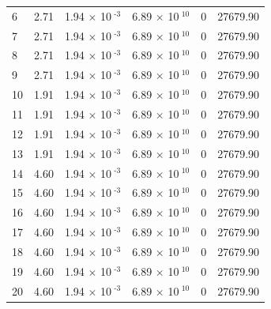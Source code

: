 \documentclass[a4paper,11pt]{article}
\begin{document}
\begin{center}
\begin{longtable}{|R{1.5cm}|R{2.4cm}|R{2.4cm}|R{2.4cm}|R{2.4cm}|R{2.4cm}|}
    6 &   2.71  &         1.94 $\times$ 10$^{\text{          -3}}$  &         6.89 $\times$ 10$^{\text{          10}}$  & 0  & 27679.90 \\
    7 &   2.71  &         1.94 $\times$ 10$^{\text{          -3}}$  &         6.89 $\times$ 10$^{\text{          10}}$  & 0  & 27679.90 \\
    8 &   2.71  &         1.94 $\times$ 10$^{\text{          -3}}$  &         6.89 $\times$ 10$^{\text{          10}}$  & 0  & 27679.90 \\
    9 &   2.71  &         1.94 $\times$ 10$^{\text{          -3}}$  &         6.89 $\times$ 10$^{\text{          10}}$  & 0  & 27679.90 \\
   10 &   1.91  &         1.94 $\times$ 10$^{\text{          -3}}$  &         6.89 $\times$ 10$^{\text{          10}}$  & 0  & 27679.90 \\
   11 &   1.91  &         1.94 $\times$ 10$^{\text{          -3}}$  &         6.89 $\times$ 10$^{\text{          10}}$  & 0  & 27679.90 \\
   12 &   1.91  &         1.94 $\times$ 10$^{\text{          -3}}$  &         6.89 $\times$ 10$^{\text{          10}}$  & 0  & 27679.90 \\
   13 &   1.91  &         1.94 $\times$ 10$^{\text{          -3}}$  &         6.89 $\times$ 10$^{\text{          10}}$  & 0  & 27679.90 \\
   14 &   4.60  &         1.94 $\times$ 10$^{\text{          -3}}$  &         6.89 $\times$ 10$^{\text{          10}}$  & 0  & 27679.90 \\
   15 &   4.60  &         1.94 $\times$ 10$^{\text{          -3}}$  &         6.89 $\times$ 10$^{\text{          10}}$  & 0  & 27679.90 \\
   16 &   4.60  &         1.94 $\times$ 10$^{\text{          -3}}$  &         6.89 $\times$ 10$^{\text{          10}}$  & 0  & 27679.90 \\
   17 &   4.60  &         1.94 $\times$ 10$^{\text{          -3}}$  &         6.89 $\times$ 10$^{\text{          10}}$  & 0  & 27679.90 \\
   18 &   4.60  &         1.94 $\times$ 10$^{\text{          -3}}$  &         6.89 $\times$ 10$^{\text{          10}}$  & 0  & 27679.90 \\
   19 &   4.60  &         1.94 $\times$ 10$^{\text{          -3}}$  &         6.89 $\times$ 10$^{\text{          10}}$  & 0  & 27679.90 \\
   20 &   4.60  &         1.94 $\times$ 10$^{\text{          -3}}$  &         6.89 $\times$ 10$^{\text{          10}}$  & 0  & 27679.90 \\

\end{longtable}
\end{center}
\end{document}
